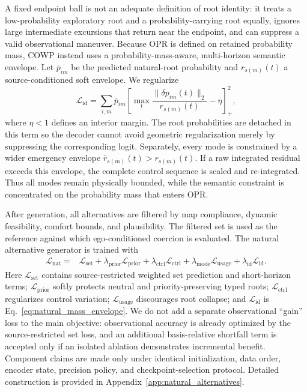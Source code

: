 \documentclass[10pt]{article}
\begin{document}
A fixed endpoint ball is not an adequate definition of root identity: it treats a low-probability exploratory root and a probability-carrying root equally, ignores large intermediate excursions that return near the endpoint, and can suppress a valid observational maneuver. Because OPR is defined on retained probability mass, COWP instead uses a probability-mass-aware, multi-horizon semantic envelope. Let $\bar p_{im}$ be the predicted natural-root probability and $r_{s(m)}(t)$ a source-conditioned soft envelope. We regularize
\begin{equation}
    \mathcal{L}_{\mathrm{id}}
    =
    \sum_{i,m}\bar p_{im}
    \left[
      \max_t\frac{\|\delta p_{im}(t)\|_2}{r_{s(m)}(t)}-\eta
    \right]_+^2,
    \label{eq:natural_mass_envelope}
\end{equation}
where $\eta<1$ defines an interior margin. The root probabilities are detached in this term so the decoder cannot avoid geometric regularization merely by suppressing the corresponding logit. Separately, every mode is constrained by a wider emergency envelope $\bar r_{s(m)}(t)>r_{s(m)}(t)$. If a raw integrated residual exceeds this envelope, the complete control sequence is scaled and re-integrated. Thus all modes remain physically bounded, while the semantic constraint is concentrated on the probability mass that enters OPR.

After generation, all alternatives are filtered by map compliance, dynamic feasibility, comfort bounds, and plausibility. The filtered set is used as the reference against which ego-conditioned coercion is evaluated. The natural alternative generator is trained with
\begin{equation}
\begin{aligned}
    \mathcal{L}_{\mathrm{nat}}
    ={}&
    \mathcal{L}_{\mathrm{set}}
    +\lambda_{\mathrm{prior}}\mathcal{L}_{\mathrm{prior}}
    +\lambda_{\mathrm{ctrl}}\mathcal{L}_{\mathrm{ctrl}}
    +\lambda_{\mathrm{mode}}\mathcal{L}_{\mathrm{usage}}
    +\lambda_{\mathrm{id}}\mathcal{L}_{\mathrm{id}}.
\end{aligned}
\end{equation}
Here $\mathcal{L}_{\mathrm{set}}$ contains source-restricted weighted set prediction and short-horizon terms; $\mathcal{L}_{\mathrm{prior}}$ softly protects neutral and priority-preserving typed roots; $\mathcal{L}_{\mathrm{ctrl}}$ regularizes control variation; $\mathcal{L}_{\mathrm{usage}}$ discourages root collapse; and $\mathcal{L}_{\mathrm{id}}$ is Eq.~\eqref{eq:natural_mass_envelope}. We do not add a separate observational ``gain'' loss to the main objective: observational accuracy is already optimized by the source-restricted set loss, and an additional basis-relative shortfall term is accepted only if an isolated ablation demonstrates incremental benefit. Component claims are made only under identical initialization, data order, encoder state, precision policy, and checkpoint-selection protocol. Detailed construction is provided in Appendix~\ref{app:natural_alternatives}.
\end{document}
